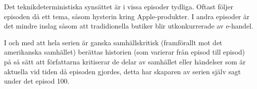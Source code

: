 \documentclass[12pt,a4paper]{article}
\begin{document}
Det teknikdeterministiska synsättet är i vissa episoder tydliga. Oftast följer episoden då ett tema, såsom hysterin kring Apple-produkter. I andra episoder är det mindre inslag såsom att tradidionella butiker blir utkonkurrerade av e-handel.

I och med att hela serien är ganska samhällskritisk (framförallt mot det amerikanska samhället) berättas historien (som varierar från episod till episod) på så sätt att författarna kritiserar de delar av samhället eller händelser som är aktuella vid tiden då episoden gjordes, detta har skaparen av serien själv sagt under det episod 100.
\end{document}
